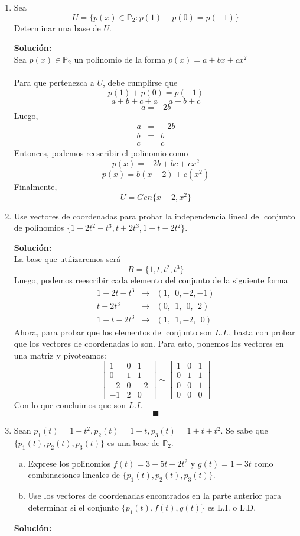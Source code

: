 \documentclass[12pt]{article}
\newenvironment{solucion}
{\begin{mdframed}[backgroundcolor=black!10]
		{\bf Solución:}\\
	}
	{
	\end{mdframed}
}
\newenvironment{preguntas}
{\begin{enumerate}\itemsep12pt
	}
	{
	\end{enumerate}
}
\newcommand{\ra}{\rightarrow}
\begin{document}
\begin{preguntas}
\item Sea 
	$$U=\{p(x) \in \mathbb{P}_2 : p(1) + p(0) = p(-1)\}$$
	Determinar una base de $U$.
\begin{solucion}
			Sea $p(x) \in \mathbb{P}_2$ un polinomio de la forma $p(x) = a + bx + cx^2$\\
			\\
			Para que pertenezca a $U$, debe cumplirse que
			$$p(1) + p(0) = p(-1)$$
			$$a+b+c+a=a-b+c$$
			$$a = -2b$$
			Luego,
			$$\begin{array}{rcl}
			a & = & -2b\\
			b & = & b\\
			c & = & c
			\end{array}$$
			Entonces, podemos reescribir el polinomio como
			$$p(x) = -2b + bc + cx^2$$
			$$p(x) = b(x-2) + c(x^2)$$
			Finalmente,
			$$U = Gen\{x-2, x^2\}$$
\end{solucion}
\item Use vectores de coordenadas para probar la independencia lineal del conjunto de polinomios $\{1-2t^2-t^3,t+2t^3,1+t-2t^2\}$.
\begin{solucion}
La base que utilizaremos será
		$$B = \{1,t,t^2,t^3\}$$
		Luego, podemos reescribir cada elemento del conjunto de la siguiente forma
		$$\begin{array}{lcl}
		1-2t-t^3 & \ra & (1,\ \ 0,-2,-1)\\
		t+2t^3 & \ra & (0,\ \ 1,\ \ 0,\ \ 2)\\
		1+t-2t^3 & \ra & (1,\ \ 1,-2,\ \ 0)
		\end{array}$$
		Ahora, para probar que los elementos del conjunto son $L.I.$, basta con probar que los vectores de coordenadas lo son. Para esto, ponemos los vectores en una matriz y pivoteamos:
		$$\begin{bmatrix}
		1 & 0 & 1\\
		0 & 1 & 1\\
		-2 & 0 & -2\\
		-1 & 2 & 0
		\end{bmatrix} \sim
		\begin{bmatrix}
		1 & 0 & 1\\
		0 & 1 & 1\\
		0 & 0 & 1\\
		0 & 0 & 0
		\end{bmatrix}$$
		Con lo que concluimos que son $L.I.$
		$$\blacksquare$$
\end{solucion}
\item Sean $p_1(t) = 1-t^2, p_2(t) = 1+t, p_3(t) = 1+t+t^2$. Se sabe que $\{p_1(t), p_2(t), p_3(t)\}$ es una base de $\mathbb{P}_2$.
\begin{enumerate}[a)]
\item Exprese los polinomios $f(t) = 3-5t + 2t^2$ y $g(t) = 1-3t$ como combinaciones lineales de $\{p_1(t), p_2(t), p_3(t)\}$.
\item Use los vectores de coordenadas encontrados en la parte anterior para determinar si el conjunto $\{p_1(t), f(t), g(t)\}$ es L.I. o L.D.
\end{enumerate}
\begin{solucion}


\end{solucion}
\end{preguntas}
\end{document}
